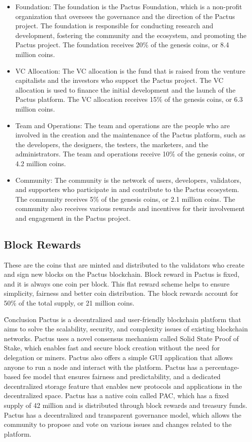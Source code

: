 \documentclass{novel}
\begin{document}
\begin{itemize}
  \item
    Foundation: The foundation is the Pactus Foundation, which is a non-profit organization that oversees the governance and the direction of the Pactus project. The foundation is responsible for conducting research and development, fostering the community and the ecosystem, and promoting the Pactus project. The foundation receives 20\% of the genesis coins, or 8.4 million coins.
  \item
    VC Allocation: The VC allocation is the fund that is raised from the venture capitalists and the investors who support the Pactus project. The VC allocation is used to finance the initial development and the launch of the Pactus platform. The VC allocation receives 15\% of the genesis coins, or 6.3 million coins.
  \item
    Team and Operations: The team and operations are the people who are involved in the creation and the maintenance of the Pactus platform, such as the developers, the designers, the testers, the marketers, and the administrators. The team and operations receive 10\% of the genesis coins, or 4.2 million coins.
  \item
    Community: The community is the network of users, developers, validators, and supporters who participate in and contribute to the Pactus ecosystem. The community receives 5\% of the genesis coins, or 2.1 million coins. The community also receives various rewards and incentives for their involvement and engagement in the Pactus project.
\end{itemize}

\subsection{Block Rewards} These are the coins that are minted and distributed to the validators who create and sign new blocks on the Pactus blockchain. Block reward in Pactus is fixed, and it is always one coin per block. This flat reward scheme helps to ensure simplicity, fairness and better coin distribution. The block rewards account for 50\% of the total supply, or 21 million coins.


\h{Conclusion}
Pactus is a decentralized and user-friendly blockchain platform that aims to solve the scalability, security, and complexity issues of existing blockchain networks. Pactus uses a novel consensus mechanism called Solid State Proof of Stake, which enables fast and secure block creation without the need for delegation or miners. Pactus also offers a simple GUI application that allows anyone to run a node and interact with the platform. Pactus has a percentage-based fee model that ensures fairness and predictability, and a dedicated decentralized storage feature that enables new protocols and applications in the decentralized space. Pactus has a native coin called PAC, which has a fixed supply of 42 million and is distributed through block rewards and treasury funds. Pactus has a decentralized and transparent governance model, which allows the community to propose and vote on various issues and changes related to the platform.
\end{document}
